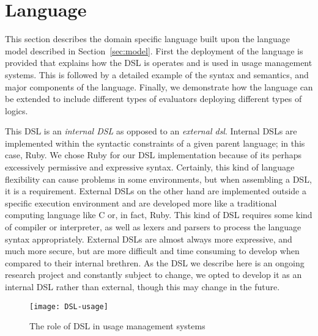 \section{Language}\label{sec:language}
This section describes the domain specific language built upon the language model described in Section~\ref{sec:model}. First the deployment of the language is provided that explains how the DSL is operates and is used in usage management systems. This is followed by a detailed example of the syntax and semantics, and major components of the language. Finally, we demonstrate how the language can be extended to include different types of evaluators deploying different types of logics.

This DSL is an {\em internal DSL} as opposed to an {\em external dsl}.  Internal DSLs are implemented within the syntactic constraints of a given parent language; in this case, Ruby.  We chose Ruby for our DSL implementation because of its perhaps excessively permissive and expressive syntax.  Certainly, this kind of language flexibility can cause problems in some environments, but when assembling a DSL, it is a requirement.  External DSLs on the other hand are implemented outside a specific execution environment and are developed more like a traditional computing language like C or, in fact, Ruby. This kind of DSL requires some kind of compiler or interpreter, as well as lexers and parsers to process the language syntax appropriately.  External DSLs are almost always more expressive, and much more secure, but are more difficult and time consuming to develop when compared to their internal brethren.  As the DSL we describe here is an ongoing research project and constantly subject to change, we opted to develop it as an internal DSL rather than external, though this may change in the future.

\begin{figure}[!t]
\centering
\texttt{[image: DSL-usage]}
\caption{The role of DSL in usage management systems}
\label{fig:DSL-usage}
\end{figure}

